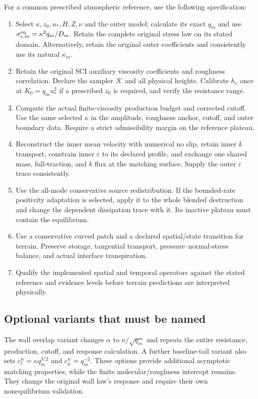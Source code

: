 \documentclass[11pt,a4paper]{article}
\numberwithin{equation}{section}
\newcommand{\eps}{\varepsilon}
\newcommand{\ust}{u_*}
\begin{document}
For a common prescribed atmospheric reference, use the following
specification:
\begin{enumerate}
\item Select $\kappa,z_0,\ust,H,Z,\nu$ and the outer model; calculate
its exact $q_m$ and use
$\sigma_{\eps,m}^{\rm eq}=\kappa^2q_m/D_m$.
Retain the complete original stress law on its stated domain.
Alternatively, retain the original outer coefficients and consistently
use its natural $\kappa_m$.
\item Retain the original SCI auxiliary viscosity coefficients and
roughness correlation. Declare the sampler $\mathcal K$ and all
physical heights. Calibrate $h_r$ once at $K_0=q_m\ust^2$ if a
prescribed $z_0$ is required, and verify the resistance range.
\item Compute the actual finite-viscosity production budget and
corrected cutoff. Use the same selected $\kappa$ in the amplitude,
roughness anchor, cutoff, and outer boundary data. Require a strict
admissibility margin on the reference plateau.
\item Reconstruct the inner mean velocity with numerical no slip,
retain inner $k$ transport, constrain inner $\eps$ to its declared
profile, and exchange one shared mass, full-traction, and $k$ flux
at the matching surface. Supply the outer $\eps$ trace consistently.
\item Use the all-mode conservative source redistribution. If the
bounded-rate positivity adaptation is selected, apply it to the whole
blended destruction and change the dependent dissipation trace with it.
Its inactive plateau must contain the equilibrium.
\item Use a conservative curved patch and a declared spatial/state
transition for terrain. Preserve storage, tangential transport,
pressure--normal-stress balance, and actual interface transpiration.
\item Qualify the implemented spatial and temporal operators against
the stated reference and evidence levels before terrain predictions
are interpreted physically.
\end{enumerate}

\subsection{Optional variants that must be named}

The wall overlap variant changes
$\alpha$ to $\kappa/\sqrt{q_m}$ and repeats the entire resistance,
production, cutoff, and response calculation. A further baseline-tail
variant also sets $c_\ell^w=\kappa q_m^{3/2}$ and
$c_\mu^w=q_m^{-2}$. These options provide additional asymptotic
matching properties, while the finite molecular/roughness intercept
remains. They change the original wall law's response and require
their own nonequilibrium validation.
\end{document}
